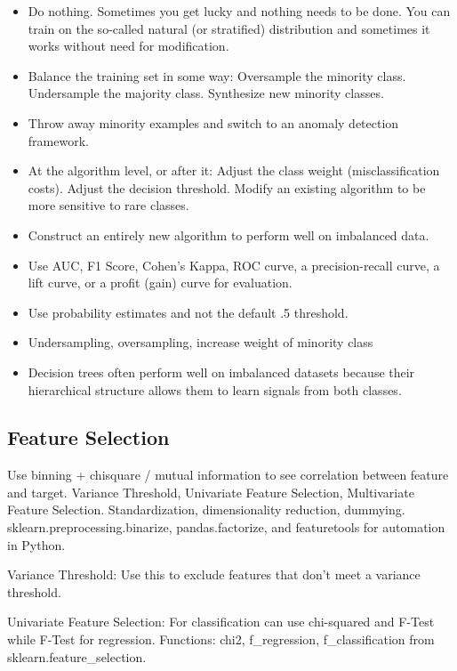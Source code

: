 \documentclass[]{book}
\begin{document}
\begin{itemize}
\item
  Do nothing. Sometimes you get lucky and nothing needs to be done. You can train on the so-called natural (or stratified) distribution and sometimes it works without need for modification.
\item
  Balance the training set in some way: Oversample the minority class. Undersample the majority class.
  Synthesize new minority classes.
\item
  Throw away minority examples and switch to an anomaly detection framework.
\item
  At the algorithm level, or after it: Adjust the class weight (misclassification costs). Adjust the decision threshold. Modify an existing algorithm to be more sensitive to rare classes.
\item
  Construct an entirely new algorithm to perform well on imbalanced data.
\item
  Use AUC, F1 Score, Cohen's Kappa, ROC curve, a precision-recall curve, a lift curve, or a profit (gain) curve for evaluation.
\item
  Use probability estimates and not the default .5 threshold.
\item
  Undersampling, oversampling, increase weight of minority class
\item
  Decision trees often perform well on imbalanced datasets because their hierarchical structure allows them to learn signals from both classes.
\end{itemize}

\hypertarget{feature-selection}{%
\subsection{Feature Selection}\label{feature-selection}}

Use binning + chisquare / mutual information to see correlation between feature and target. Variance Threshold, Univariate Feature Selection, Multivariate Feature Selection. Standardization, dimensionality reduction, dummying. sklearn.preprocessing.binarize, pandas.factorize, and featuretools for automation in Python.

Variance Threshold: Use this to exclude features that don't meet a variance threshold.

Univariate Feature Selection: For classification can use chi-squared and F-Test while F-Test for regression. Functions: chi2, f\_regression, f\_classification from sklearn.feature\_selection.
\end{document}
